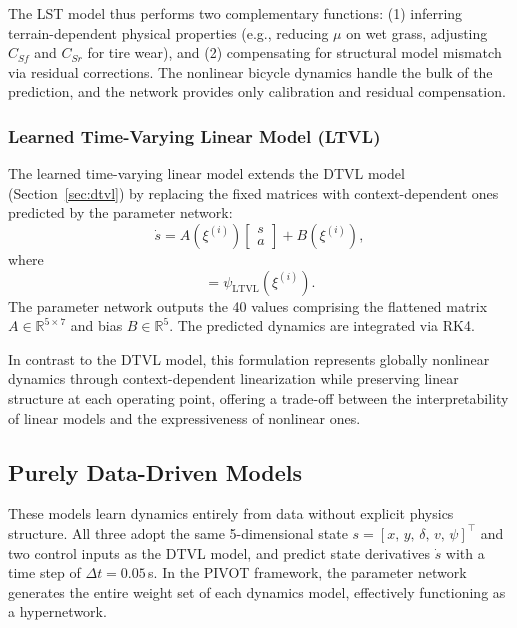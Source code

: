 The LST model thus performs two complementary functions: (1) inferring terrain-dependent physical properties (e.g., reducing $\mu$ on wet grass, adjusting $C_{Sf}$ and $C_{Sr}$ for tire wear), and (2) compensating for structural model mismatch via residual corrections. The nonlinear bicycle dynamics handle the bulk of the prediction, and the network provides only calibration and residual compensation.

\subsubsection{Learned Time-Varying Linear Model (LTVL)}
\label{sec:ltvl}

The learned time-varying linear model extends the DTVL model (Section~\ref{sec:dtvl}) by replacing the fixed matrices with context-dependent ones predicted by the parameter network:
\begin{equation}
  \dot{s} = A(\xi^{(i)})\begin{bmatrix} s \\ a \end{bmatrix} + B(\xi^{(i)}),
  \label{eq:ltvl}
\end{equation}
where
\begin{equation}
  [A(\xi^{(i)}),\, B(\xi^{(i)})] = \psi_{\text{LTVL}}(\xi^{(i)}).
\end{equation}
The parameter network outputs the 40 values comprising the flattened matrix $A \in \mathbb{R}^{5 \times 7}$ and bias $B \in \mathbb{R}^{5}$. The predicted dynamics are integrated via RK4.

In contrast to the DTVL model, this formulation represents globally nonlinear dynamics through context-dependent linearization while preserving linear structure at each operating point, offering a trade-off between the interpretability of linear models and the expressiveness of nonlinear ones.

\subsection{Purely Data-Driven Models}
\label{sec:data-driven}

These models learn dynamics entirely from data without explicit physics structure. All three adopt the same 5-dimensional state $s = [x,\, y,\, \delta,\, v,\, \psi]^\top$ and two control inputs as the DTVL model, and predict state derivatives $\dot{s}$ with a time step of $\Delta t = 0.05$\,s. In the PIVOT framework, the parameter network generates the entire weight set of each dynamics model, effectively functioning as a hypernetwork.

